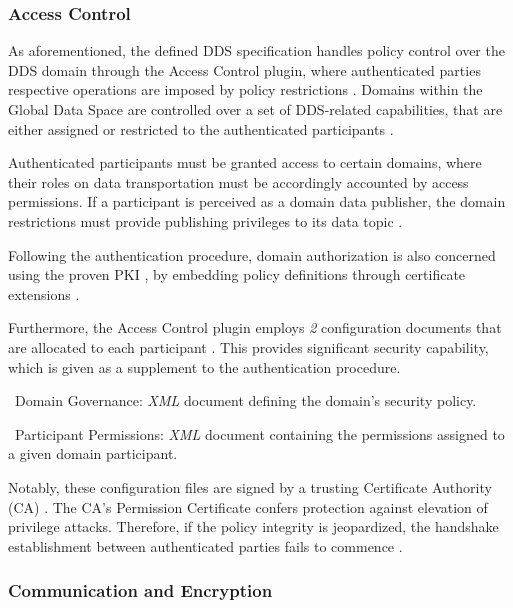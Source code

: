 \subsubsection{Access Control}

As aforementioned, the defined DDS specification handles policy control over the DDS domain through the Access Control plugin, where authenticated parties respective operations are imposed by policy restrictions \cite{dds-s, white2019network}. Domains within the Global Data Space are controlled over a set of DDS-related capabilities, that are either assigned or restricted to the authenticated participants \cite{ros-dds-integration}. 

Authenticated participants must be granted access to certain domains, where their roles on data transportation must be accordingly accounted by access permissions. If a participant is perceived as a domain data publisher, the domain restrictions must provide publishing privileges to its data topic \cite{white2019network}. 

Following the authentication procedure, domain authorization is also concerned using the proven PKI \cite{ros-dds-integration}, by embedding policy definitions through certificate extensions \cite{white2016sros}. 

Furthermore, the Access Control plugin employs \textit{2} configuration documents that are allocated to each participant \cite{white2019network}. This provides significant security capability, which is given as a supplement to the authentication procedure.

\textbullet\ Domain Governance: \textit{XML} document defining the domain's security policy.

\textbullet\ Participant Permissions: \textit{XML} document containing the permissions assigned to a given domain participant.

Notably, these configuration files are signed by a trusting Certificate Authority (CA) \cite{ros-dds-integration}. The CA's Permission Certificate confers protection against elevation of privilege attacks. Therefore, if the policy integrity is jeopardized, the handshake establishment between authenticated parties fails to commence \cite{white2016sros}.

\subsubsection{Communication and Encryption}


